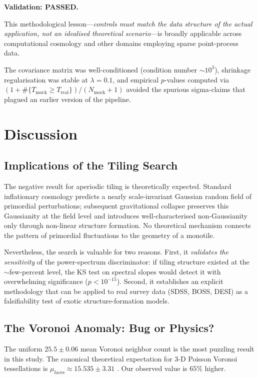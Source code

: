 \documentclass[12pt,a4paper]{article}
\begin{document}
\textbf{Validation: PASSED.}

This methodological lesson---\emph{controls must match the data structure of the
actual application, not an idealised theoretical scenario}---is broadly
applicable across computational cosmology and other domains employing sparse
point-process data.

The covariance matrix was well-conditioned (condition number $\sim 10^3$),
shrinkage regularisation was stable at $\lambda = 0.1$, and empirical
$p$-values computed via $(1 + \#\{T_\mathrm{mock} \geq T_\mathrm{real}\}) /
(N_\mathrm{mock}+1)$ avoided the spurious sigma-claims that plagued an earlier
version of the pipeline.

\section{Discussion}
\label{sec:discussion}

\subsection{Implications of the Tiling Search}

The negative result for aperiodic tiling is theoretically expected.  Standard
inflationary cosmology predicts a nearly scale-invariant Gaussian random field
of primordial perturbations; subsequent gravitational collapse preserves this
Gaussianity at the field level and introduces well-characterised non-Gaussianity
only through non-linear structure formation.  No theoretical mechanism connects
the pattern of primordial fluctuations to the geometry of a monotile.

Nevertheless, the search is valuable for two reasons.  First, it \emph{validates
the sensitivity} of the power-spectrum discriminator: if tiling structure existed
at the $\sim$few-percent level, the KS test on spectral slopes would detect it
with overwhelming significance ($p < 10^{-15}$).  Second, it establishes an
explicit methodology that can be applied to real survey data (SDSS, BOSS, DESI)
as a falsifiability test of exotic structure-formation models.

\subsection{The Voronoi Anomaly: Bug or Physics?}

The uniform $25.5 \pm 0.06$ mean Voronoi neighbor count is the most puzzling
result in this study.  The canonical theoretical expectation for 3-D Poisson
Voronoi tessellations is $\mu_\text{faces} \approx 15.535 \pm 3.31$
\citep{meijering1953interface}.  Our observed value is $65\%$ higher.
\end{document}
